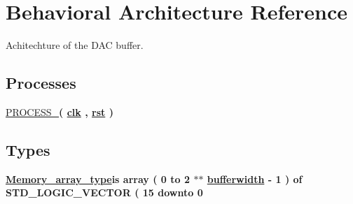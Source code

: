 \hypertarget{classDAC__buffer_1_1Behavioral}{\section{Behavioral Architecture Reference}
\label{classDAC__buffer_1_1Behavioral}
}


Achitechture of the D\-A\-C buffer.  


\subsection*{Processes}
 \begin{DoxyCompactItemize}
\item 
\hypertarget{classDAC__buffer_1_1Behavioral_a59eb74dc65f67582e3c037f7786d7adc}{\hyperlink{classDAC__buffer_1_1Behavioral_a59eb74dc65f67582e3c037f7786d7adc}{P\-R\-O\-C\-E\-S\-S\-\_}{\bfseries  ( {\bfseries {\bfseries \hyperlink{classDAC__buffer_a8120037e0ee47c35ba2d79242209c72e}{clk}} \textcolor{vhdlchar}{ }\textcolor{vhdlchar}{ }\textcolor{vhdlchar}{ }} , {\bfseries {\bfseries \hyperlink{classDAC__buffer_aa7b7040844189161771c36cf6bbf172c}{rst}} \textcolor{vhdlchar}{ }} )}}\label{classDAC__buffer_1_1Behavioral_a59eb74dc65f67582e3c037f7786d7adc}

\end{DoxyCompactItemize}
\subsection*{Types}
 \begin{DoxyCompactItemize}
\item 
\hypertarget{classDAC__buffer_1_1Behavioral_a658e2166090ca64ce974029de2840027}{{\bfseries \hyperlink{classDAC__buffer_1_1Behavioral_a658e2166090ca64ce974029de2840027}{Memory\-\_\-array\-\_\-type}{\bfseries \textcolor{vhdlkeyword}{is}\textcolor{vhdlchar}{ }\textcolor{vhdlchar}{ }\textcolor{vhdlkeyword}{array}\textcolor{vhdlchar}{ }\textcolor{vhdlchar}{(}\textcolor{vhdlchar}{ } \textcolor{vhdldigit}{0} \textcolor{vhdlchar}{ }\textcolor{vhdlchar}{ }\textcolor{vhdlchar}{ }\textcolor{vhdlkeyword}{to}\textcolor{vhdlchar}{ }\textcolor{vhdlchar}{ }\textcolor{vhdlchar}{ } \textcolor{vhdldigit}{2} \textcolor{vhdlchar}{ }\textcolor{vhdlchar}{$\ast$}\textcolor{vhdlchar}{$\ast$}\textcolor{vhdlchar}{ }{\bfseries \hyperlink{classDAC__buffer_a2f94b7b31a8914ee23be5e000f89e921}{bufferwidth}} \textcolor{vhdlchar}{ }\textcolor{vhdlchar}{-\/}\textcolor{vhdlchar}{ } \textcolor{vhdldigit}{1} \textcolor{vhdlchar}{ }\textcolor{vhdlchar}{)}\textcolor{vhdlchar}{ }\textcolor{vhdlchar}{ }\textcolor{vhdlkeyword}{of}\textcolor{vhdlchar}{ }\textcolor{comment}{S\-T\-D\-\_\-\-L\-O\-G\-I\-C\-\_\-\-V\-E\-C\-T\-O\-R}\textcolor{vhdlchar}{ }\textcolor{vhdlchar}{(}\textcolor{vhdlchar}{ }\textcolor{vhdlchar}{ } \textcolor{vhdldigit}{15} \textcolor{vhdlchar}{ }\textcolor{vhdlchar}{ }\textcolor{vhdlchar}{ }\textcolor{vhdlkeyword}{downto}\textcolor{vhdlchar}{ }\textcolor{vhdlchar}{ }\textcolor{vhdlchar}{ } \textcolor{vhdldigit}{0} \textcolor{vhdlchar}{ }}} }\label{classDAC__buffer_1_1Behavioral_a658e2166090ca64ce974029de2840027}

\end{DoxyCompactItemize}
